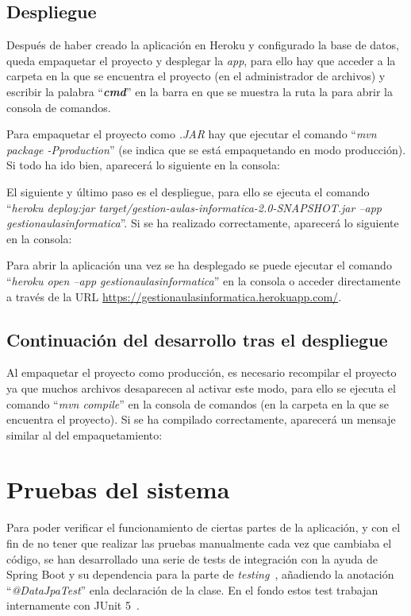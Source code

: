 \subsection{Despliegue}
Después de haber creado la aplicación en Heroku y configurado la base de datos, queda empaquetar el proyecto y desplegar la \textit{app}, para ello hay que acceder a la carpeta en la que se encuentra el proyecto (en el administrador de archivos) y escribir la palabra ``\textbf{\textit{cmd}}'' en la barra en que se muestra la ruta la  para abrir la consola de comandos.

Para empaquetar el proyecto como \textit{.JAR} hay que ejecutar el comando ``\textit{mvn package -Pproduction}'' (se indica que se está empaquetando en modo producción). Si todo ha ido bien, aparecerá lo siguiente en la consola:


El siguiente y último paso es el despliegue, para ello se ejecuta el comando ``\textit{heroku deploy:jar target/gestion-aulas-informatica-2.0-SNAPSHOT.jar --app gestionaulasinformatica}''. Si se ha realizado correctamente, aparecerá lo siguiente en la consola:


Para abrir la aplicación una vez se ha desplegado se puede ejecutar el comando ``\textit{heroku open --app gestionaulasinformatica}'' en la consola o acceder directamente a través de la URL \url{https://gestionaulasinformatica.herokuapp.com/}.

\subsection{Continuación del desarrollo tras el despliegue}
Al empaquetar el proyecto como producción, es necesario recompilar el proyecto ya que muchos archivos desaparecen al activar este modo, para ello se ejecuta el comando ``\textit{mvn compile}'' en la consola de comandos (en la carpeta en la que se encuentra el proyecto). Si se ha compilado correctamente, aparecerá un mensaje similar al del empaquetamiento:


\section{Pruebas del sistema}
Para poder verificar el funcionamiento de ciertas partes de la aplicación, y con el fin de no tener que realizar las pruebas manualmente cada vez que cambiaba el código, se han desarrollado una serie de tests de integración con la ayuda de Spring Boot y su dependencia para la parte de \textit{testing}~\cite{pagina_spring_boot_testing}, añadiendo la anotación ``\textit{@DataJpaTest}'' enla declaración de la clase. En el fondo estos test trabajan internamente con JUnit 5~\cite{pagina_junit}.


